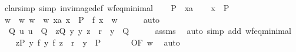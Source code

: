 \begin{isabellebody}
%
\isadelimproof
%
\endisadelimproof
%
\isatagproof
{}\isamarkupfalse%
\ {\isacharparenleft}{\kern0pt}clarsimp\ simp{\isacharcolon}{\kern0pt}\ inv{\isacharunderscore}{\kern0pt}image{\isacharunderscore}{\kern0pt}def\ wf{\isacharunderscore}{\kern0pt}eq{\isacharunderscore}{\kern0pt}minimal{\isacharparenright}{\kern0pt}\isanewline
\ \ \isamarkupfalse%
\ P\ \ x{\isacharcolon}{\kern0pt}{\isacharcolon}{\kern0pt}{\isacharprime}{\kern0pt}a\isanewline
\ \ \isamarkupfalse%
\ {\isachardoublequoteopen}x\ {\isasymin}\ P{\isachardoublequoteclose}\isanewline
\ \ \isamarkupfalse%
\ \isamarkupfalse%
\ w\ \ w{\isacharcolon}{\kern0pt}\ {\isachardoublequoteopen}w\ {\isasymin}\ {\isacharbraceleft}{\kern0pt}w{\isachardot}{\kern0pt}\ {\isasymexists}x{\isacharcolon}{\kern0pt}{\isacharcolon}{\kern0pt}{\isacharprime}{\kern0pt}a{\isachardot}{\kern0pt}\ x\ {\isasymin}\ P\ {\isasymand}\ f\ x\ {\isacharequal}{\kern0pt}\ w{\isacharbraceright}{\kern0pt}{\isachardoublequoteclose}\isanewline
\ \ \ \ \isamarkupfalse%
\ auto\isanewline
\ \ \isamarkupfalse%
\ {\isacharasterisk}{\kern0pt}{\isacharcolon}{\kern0pt}\ {\isachardoublequoteopen}{\isasymAnd}Q\ u{\isachardot}{\kern0pt}\ u\ {\isasymin}\ Q\ {\isasymLongrightarrow}\ {\isasymexists}z{\isasymin}Q{\isachardot}{\kern0pt}\ {\isasymforall}y{\isachardot}{\kern0pt}\ {\isacharparenleft}{\kern0pt}y{\isacharcomma}{\kern0pt}\ z{\isacharparenright}{\kern0pt}\ {\isasymin}\ r\ {\isasymlongrightarrow}\ y\ {\isasymnotin}\ Q{\isachardoublequoteclose}\isanewline
\ \ \ \ \isamarkupfalse%
\ assms\ \isamarkupfalse%
\ {\isacharparenleft}{\kern0pt}auto\ simp\ add{\isacharcolon}{\kern0pt}\ wf{\isacharunderscore}{\kern0pt}eq{\isacharunderscore}{\kern0pt}minimal{\isacharparenright}{\kern0pt}\isanewline
\ \ \isamarkupfalse%
\ {\isachardoublequoteopen}{\isasymexists}z{\isasymin}P{\isachardot}{\kern0pt}\ {\isasymforall}y{\isachardot}{\kern0pt}\ {\isacharparenleft}{\kern0pt}f\ y{\isacharcomma}{\kern0pt}\ f\ z{\isacharparenright}{\kern0pt}\ {\isasymin}\ r\ {\isasymlongrightarrow}\ y\ {\isasymnotin}\ P{\isachardoublequoteclose}\isanewline
\ \ \ \ \isamarkupfalse%
\ {\isacharasterisk}{\kern0pt}\ {\isacharbrackleft}{\kern0pt}OF\ w{\isacharbrackright}{\kern0pt}\ \isamarkupfalse%
\ auto\isanewline
{}\isamarkupfalse%
%
\endisatagproof
{\isafoldproof}%
%
\isadelimproof
%
\endisadelimproof
%
\begin{isamarkuptext}%

\end{isamarkuptext}
\end{isabellebody}
